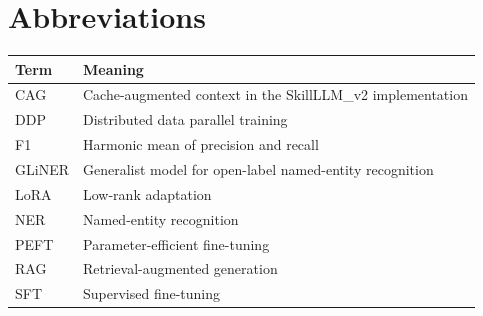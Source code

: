 \documentclass[12pt,letterpaper]{report}
\begin{document}
\chapter*{Abbreviations}
\begin{longtable}{p{}p{}}
\toprule
Term & Meaning \\
\midrule
\endhead
CAG & Cache-augmented context in the SkillLLM\_v2 implementation \\
DDP & Distributed data parallel training \\
F1 & Harmonic mean of precision and recall \\
GLiNER & Generalist model for open-label named-entity recognition \\
LoRA & Low-rank adaptation \\
NER & Named-entity recognition \\
PEFT & Parameter-efficient fine-tuning \\
RAG & Retrieval-augmented generation \\
SFT & Supervised fine-tuning \\
\bottomrule
\end{longtable}

\clearpage
{}











\appendix






\end{document}
